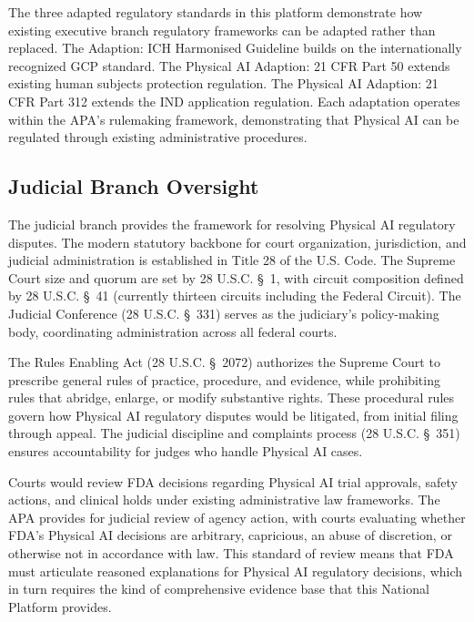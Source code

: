 The three adapted regulatory standards in this platform demonstrate how
existing executive branch regulatory frameworks can be adapted rather than
replaced. The Adaption: ICH Harmonised Guideline \cite{ich-adapt} builds on the
internationally recognized GCP standard. The Physical AI Adaption: 21 CFR Part
50 \cite{cfr50-adapt} extends existing human subjects protection regulation. The
Physical AI Adaption: 21 CFR Part 312 \cite{cfr312-adapt} extends the IND
application regulation. Each adaptation operates within the APA's rulemaking
framework, demonstrating that Physical AI can be regulated through existing
administrative procedures.

\subsection{Judicial Branch Oversight}
\label{subsec:judicial}

The judicial branch provides the framework for resolving Physical AI regulatory
disputes. The modern statutory backbone for court organization, jurisdiction,
and judicial administration is established in Title 28 of the U.S. Code. The
Supreme Court size and quorum are set by 28 U.S.C. \S~1, with circuit
composition defined by 28 U.S.C. \S~41 (currently thirteen circuits including
the Federal Circuit). The Judicial Conference (28 U.S.C. \S~331) serves as the
judiciary's policy-making body, coordinating administration across all federal
courts.

The Rules Enabling Act (28 U.S.C. \S~2072) authorizes the Supreme Court to
prescribe general rules of practice, procedure, and evidence, while prohibiting
rules that abridge, enlarge, or modify substantive rights. These procedural
rules govern how Physical AI regulatory disputes would be litigated, from
initial filing through appeal. The judicial discipline and complaints process
(28 U.S.C. \S~351) ensures accountability for judges who handle Physical AI
cases.

Courts would review FDA decisions regarding Physical AI trial approvals, safety
actions, and clinical holds under existing administrative law frameworks. The
APA provides for judicial review of agency action, with courts evaluating
whether FDA's Physical AI decisions are arbitrary, capricious, an abuse of
discretion, or otherwise not in accordance with law. This standard of review
means that FDA must articulate reasoned explanations for Physical AI regulatory
decisions, which in turn requires the kind of comprehensive evidence base that
this National Platform provides.


